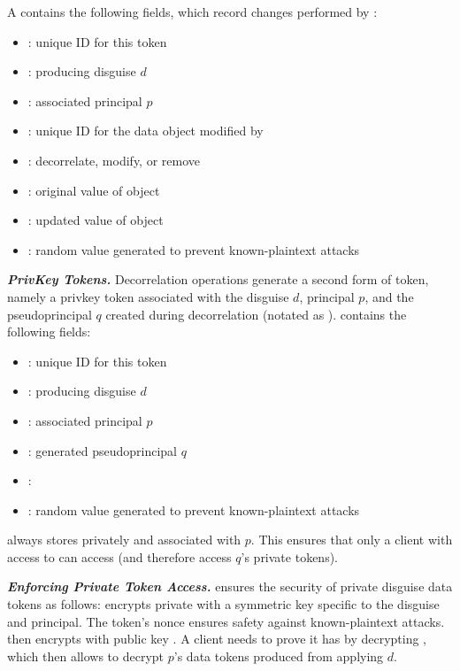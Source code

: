 A  contains the following fields, which record changes performed by :
\begin{itemize}
\item {}: unique ID for this token
\item {}: producing disguise $d$ 
\item {}: associated principal $p$
\item {}: unique ID for the data object modified by 
\item {}: decorrelate, modify, or remove
\item {}: original value of object 
\item {}: updated value of object 
\item {}: random value generated to prevent known-plaintext attacks
\end{itemize}

\noindent\textbf{\emph{PrivKey Tokens.}}
Decorrelation operations generate a second form of token, namely a privkey token associated with the disguise $d$, principal $p$, and the pseudoprincipal $q$ created
during decorrelation (notated as ).
 contains the following fields:
\begin{itemize}
\item {}: unique ID for this token
\item {}: producing disguise $d$ 
\item {}: associated principal $p$
\item {}: generated pseudoprincipal $q$
\item {}: 
\item {}: random value generated to prevent known-plaintext attacks
\end{itemize}
\sys always stores  privately and associated with $p$. This ensures that only a client
with access to  can access  (and therefore access $q$'s private tokens).

\vspace{12pt}
\noindent\textbf{\emph{Enforcing Private Token Access.}}
\sys ensures the security of private disguise data tokens as follows: \sys encrypts private
 with a symmetric key  specific to the disguise and principal. The token's nonce
ensures safety against known-plaintext attacks. \sys then encrypts  with public key
.  
%
A client needs to prove it has  by decrypting , which then allows \sys
to decrypt $p$'s data tokens produced from applying $d$.

